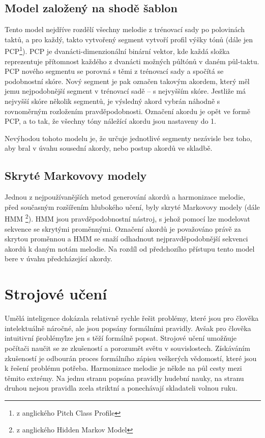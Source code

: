 \section{Model založený na shodě šablon}
\label{shodaSablon}
Tento model nejdříve rozdělí všechny melodie z trénovací sady po polovinách taktů, 
a pro každý, takto vytvořený segment vytvoří profil výšky tónů 
(dále jen PCP\footnote{z anglického Pitch Class Profile}).
\cite{YinCheng_comparativeStudy}
PCP je dvanácti-dimenzionální binární vektor, 
kde každá složka reprezentuje přítomnost 
každého z dvanácti možných půltónů v daném půl-taktu.
\cite{fujishima}
PCP nového segmentu se porovná s těmi z trénovací sady
a spočítá se podobnostní skóre.
Nový segment je pak označen takovým akordem,
který měl jemu nejpodobnější segment v trénovací sadě -- s nejvyšším skóre.
Jestliže má nejvyšší skóre několik segmentů,
je výsledný akord vybrán náhodně s rovnoměrným rozložením pravděpodobnosti.
Označení akordu je opět ve formě PCP, a to tak,
že všechny tóny náležící akordu jsou nastaveny do 1.
\par

Nevýhodou tohoto modelu je, že určuje jednotlivé segmenty nezávisle bez toho,
aby bral v úvahu sousední akordy, nebo postup akordů ve skladbě.
\cite{YinCheng_comparativeStudy}

\section{Skryté Markovovy modely}
Jednou z nejpoužívanějších metod generování akordů a harmonizace melodie, 
před současným rozšířením hlubokého učení, byly skryté Markovovy modely 
(dále HMM \footnote{z anglického Hidden Markov Model}).
HMM jsou pravděpodobnostní nástroj, 
s jehož pomocí lze modelovat sekvence se skrytými proměnnými.
Označení akordů je považováno právě za skrytou proměnnou a 
HMM se snaží odhadnout nejpravděpodobnější sekvenci akordů
k daným notám melodie.
Na rozdíl od předchozího přístupu 
tento model bere v úvahu předcházející akordy.
\cite{YinCheng_comparativeStudy}

\chapter{Strojové učení}
Umělá inteligence dokázala relativně rychle řešit problémy, 
které jsou pro člověka intelektuálně náročné, 
ale jsou popsány formálními pravidly.
Avšak pro člověka intuitivní \"problémy\" lze jen s těží formálně popsat.
Strojové učení umožňuje počítači naučit se ze zkušeností
a porozumět světu v souvislostech.
Získáváním zkušeností je odbourán proces formálního zápisu veškerých vědomostí,
které jsou k řešení problému potřeba.
\cite{Goodfellow-et-al-2016}
Harmonizace melodie je někde na půl cesty mezi těmito extrémy.
Na jednu stranu popsána pravidly hudební nauky,
na stranu druhou nejsou pravidla zcela striktní 
a ponechávají skladateli volnou ruku.
\par

